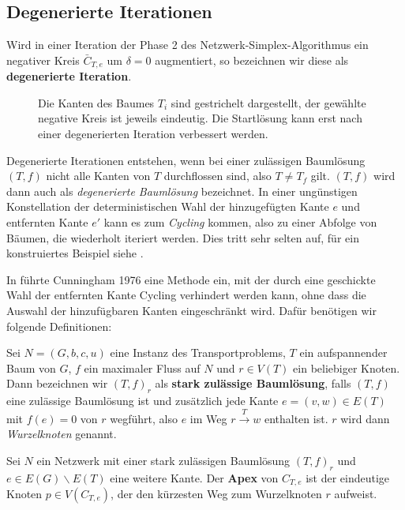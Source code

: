 \subsection{Degenerierte Iterationen}\label{ch:deg}

\begin{defn}Wird in einer Iteration der Phase 2 des Netzwerk-Simplex-Algorithmus ein negativer Kreis $\bar{C}_{T,e}$ um $\delta=0$ augmentiert, so bezeichnen wir diese als \textbf{degenerierte Iteration}.
\end{defn}

\begin{figure}[!ht]\centering
	
	\caption{Die Kanten des Baumes $T_i$ sind gestrichelt dargestellt, der gewählte negative Kreis ist jeweils eindeutig. Die Startlösung kann erst nach einer degenerierten Iteration verbessert werden.}
	\label{fig:deg}
\end{figure}

Degenerierte Iterationen entstehen, wenn bei einer zulässigen Baumlösung $(T,f)$ nicht alle Kanten von $T$ durchflossen sind, also $T\neq T_f$ gilt. $(T,f)$ wird dann auch als \emph{degenerierte Baumlösung} bezeichnet. In einer ungünstigen Konstellation der deterministischen Wahl der hinzugefügten Kante $e$ und entfernten Kante $e'$ kann es zum \emph{Cycling} kommen, also zu einer Abfolge von Bäumen, die wiederholt iteriert werden. Dies tritt sehr selten auf, für ein konstruiertes Beispiel siehe \cite[S. 303]{NSAbook}.

In \cite{cycling} führte Cunningham 1976 eine Methode ein, mit der durch eine geschickte Wahl der entfernten Kante Cycling verhindert werden kann, ohne dass die Auswahl der hinzufügbaren Kanten eingeschränkt wird. Dafür benötigen wir folgende Definitionen:

\begin{defn}Sei $N=(G,b,c,u)$ eine Instanz des Transportproblems, $T$ ein aufspannender Baum von $G$, $f$ ein maximaler Fluss auf $N$ und $r\in V(T)$ ein beliebiger Knoten. Dann bezeichnen wir $(T,f)_r$ als \textbf{stark zulässige Baumlösung}, falls $(T,f)$ eine zulässige Baumlösung ist und zusätzlich jede Kante $e=(v,w)\in E(T)$ mit $f(e)=0$ von $r$ wegführt, also $e$ im Weg $r\xrightarrow{T}w$ enthalten ist. $r$ wird dann \emph{Wurzelknoten} genannt.\end{defn}

\begin{defn}Sei $N$ ein Netzwerk mit einer stark zulässigen Baumlösung $(T,f)_r$ und $e\in E(G)\backslash E(T)$ eine weitere Kante. Der \textbf{Apex} von $C_{T,e}$ ist der eindeutige Knoten $p\in V(C_{T,e})$, der den kürzesten Weg zum Wurzelknoten $r$ aufweist.\end{defn}

